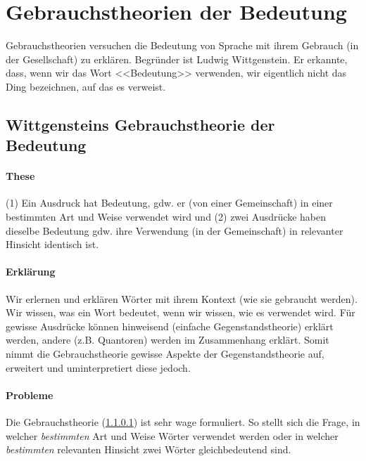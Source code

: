 \documentclass[../main.tex]{subfiles}
\begin{document}
\section{Gebrauchstheorien der Bedeutung}
Gebrauchstheorien versuchen die Bedeutung von Sprache mit ihrem Gebrauch (in der Gesellschaft) zu erklären. Begründer ist Ludwig Wittgenstein. Er erkannte, dass, wenn wir das Wort <<Bedeutung>> verwenden, wir eigentlich nicht das Ding bezeichnen, auf das es verweist. 

\subsection{Wittgensteins Gebrauchstheorie der Bedeutung}\label{SectionWittgensteinsGebrauchstheorie}
\paragraph{These}\label{these_gebrauchstheorie} (1) Ein Ausdruck hat Bedeutung, gdw. er (von einer Gemeinschaft) in einer bestimmten Art und Weise verwendet wird und (2) zwei Ausdrücke haben dieselbe Bedeutung gdw. ihre Verwendung (in der Gemeinschaft) in relevanter Hinsicht identisch ist. 

\paragraph{Erklärung} Wir erlernen und erklären Wörter mit ihrem Kontext (wie sie gebraucht werden). Wir wissen, was ein Wort bedeutet, wenn wir wissen, wie es verwendet wird. Für gewisse Ausdrücke können hinweisend (einfache Gegenstandstheorie) erklärt werden, andere (z.B. Quantoren) werden im Zusammenhang erklärt. Somit nimmt die Gebrauchstheorie gewisse Aspekte der Gegenstandstheorie auf, erweitert und uminterpretiert diese jedoch.

\paragraph{Probleme} Die Gebrauchstheorie (\ref{these_gebrauchstheorie}) ist sehr wage formuliert. So stellt sich die Frage, in welcher \textit{bestimmten} Art und Weise Wörter verwendet werden oder in welcher \textit{bestimmten} relevanten Hinsicht zwei Wörter gleichbedeutend sind.
\end{document}
